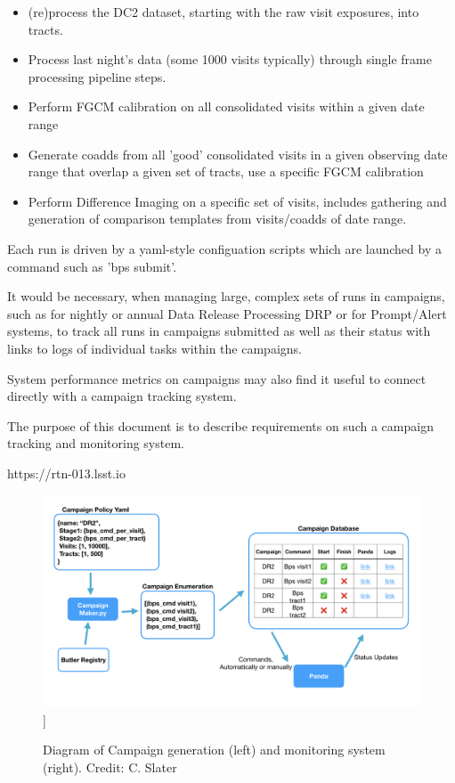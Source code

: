 \documentclass[DM,authoryear,toc]{lsstdoc}
\begin{document}
\begin{itemize}

\item (re)process the DC2 dataset, starting with the raw visit exposures,
 into tracts.  

\item Process last night's data (some 1000 visits typically) through
single frame processing pipeline steps.

\item Perform FGCM calibration on all consolidated visits within a given
date range

\item Generate coadds from all 'good' consolidated visits in a given observing
date range that overlap a given set of tracts, use a specific FGCM calibration 

\item Perform Difference Imaging on a specific set of visits, includes gathering
and generation of comparison templates from visits/coadds of date range.


\end{itemize} 

Each run is driven by a yaml-style configuation scripts which are launched
by a command such as 'bps submit'.

It would be necessary, when managing large, complex sets of runs in campaigns, 
such as for nightly or annual Data Release Processing DRP or for 
Prompt/Alert systems, to track all runs in campaigns submitted as well as their 
status with links to logs of individual tasks within the campaigns.  

System performance metrics on campaigns may also find it useful to 
connect directly with 
a campaign tracking system.

The purpose of this document is to describe requirements on such a campaign
tracking and monitoring system.

https://rtn-013.lsst.io

\begin{figure}
\includegraphics[width=\textwidth]{CampaignTooling.jpg}]
\caption{Diagram of Campaign generation (left) and monitoring system (right).
Credit: C. Slater}
\end{figure}
\end{document}
